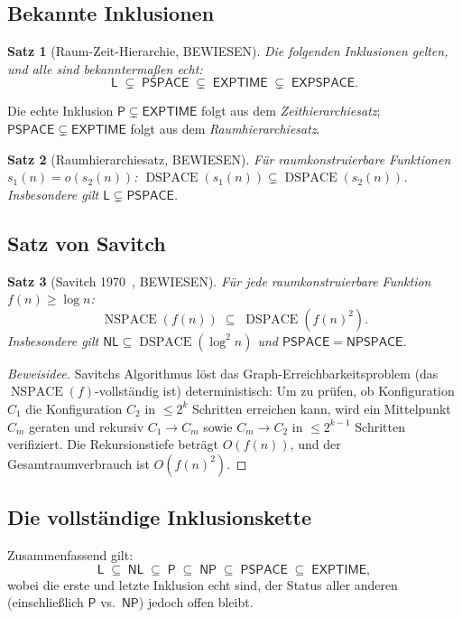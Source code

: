 \documentclass[12pt,a4paper]{amsart}
\newtheorem{theorem}{Satz}[section]
\theoremstyle{definition}
\newcommand{\Pclass}{\mathsf{P}}
\newcommand{\NP}{\mathsf{NP}}
\newcommand{\PSPACE}{\mathsf{PSPACE}}
\newcommand{\EXPTIME}{\mathsf{EXPTIME}}
\newcommand{\EXPSPACE}{\mathsf{EXPSPACE}}
\newcommand{\Lclass}{\mathsf{L}}
\newcommand{\NL}{\mathsf{NL}}
\DeclareMathOperator{\DSPACE}{DSPACE}
\DeclareMathOperator{\NSPACE}{NSPACE}
\begin{document}
\subsection{Bekannte Inklusionen}

\begin{theorem}[Raum-Zeit-Hierarchie, BEWIESEN]
Die folgenden Inklusionen gelten, und alle sind bekanntermaßen echt:
\[
  \Lclass \;\subsetneq\; \PSPACE \;\subsetneq\; \EXPTIME \;\subsetneq\; \EXPSPACE.
\]
\end{theorem}

Die echte Inklusion $\Pclass\subsetneq\EXPTIME$ folgt aus dem
\emph{Zeithierarchiesatz}; $\PSPACE\subsetneq\EXPTIME$ folgt aus dem
\emph{Raumhierarchiesatz}.

\begin{theorem}[Raumhierarchiesatz, BEWIESEN]
Für raumkonstruierbare Funktionen $s_1(n) = o(s_2(n))$:
$\DSPACE(s_1(n)) \subsetneq \DSPACE(s_2(n))$.
Insbesondere gilt $\Lclass \subsetneq \PSPACE$.
\end{theorem}

\subsection{Satz von Savitch}

\begin{theorem}[Savitch 1970~\cite{savitch1970}, BEWIESEN]
Für jede raumkonstruierbare Funktion $f(n)\geq\log n$:
\[
  \NSPACE(f(n)) \;\subseteq\; \DSPACE\!\left(f(n)^2\right).
\]
Insbesondere gilt $\NL\subseteq\DSPACE(\log^2 n)$ und
$\PSPACE = \mathsf{NPSPACE}$.
\end{theorem}

\begin{proof}[Beweisidee]
Savitchs Algorithmus löst das Graph-Erreichbarkeitsproblem (das
$\NSPACE(f)$-vollständig ist) deterministisch: Um zu prüfen, ob Konfiguration
$C_1$ die Konfiguration $C_2$ in $\leq 2^k$ Schritten erreichen kann, wird ein
Mittelpunkt $C_m$ geraten und rekursiv $C_1\to C_m$ sowie $C_m\to C_2$ in
$\leq 2^{k-1}$ Schritten verifiziert.  Die Rekursionstiefe beträgt $O(f(n))$,
und der Gesamtraumverbrauch ist $O(f(n)^2)$.
\end{proof}

\subsection{Die vollständige Inklusionskette}

Zusammenfassend gilt:
\[
  \Lclass \;\subseteq\; \NL \;\subseteq\; \Pclass \;\subseteq\; \NP \;\subseteq\;
  \PSPACE \;\subseteq\; \EXPTIME,
\]
wobei die erste und letzte Inklusion echt sind, der Status aller anderen
(einschließlich $\Pclass$ vs.\ $\NP$) jedoch offen bleibt.
\end{document}
